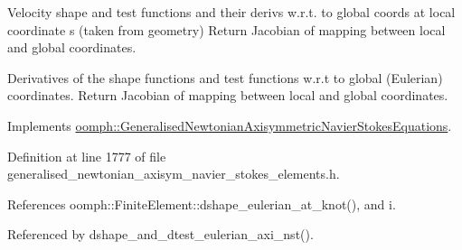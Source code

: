 Velocity shape and test functions and their derivs w.\+r.\+t. to global coords at local coordinate s (taken from geometry) Return Jacobian of mapping between local and global coordinates. 

Derivatives of the shape functions and test functions w.\+r.\+t to global (Eulerian) coordinates. Return Jacobian of mapping between local and global coordinates. 

Implements \hyperlink{classoomph_1_1GeneralisedNewtonianAxisymmetricNavierStokesEquations_aea547f513386ed96746cbf55f70d6f78}{oomph\+::\+Generalised\+Newtonian\+Axisymmetric\+Navier\+Stokes\+Equations}.



Definition at line 1777 of file generalised\+\_\+newtonian\+\_\+axisym\+\_\+navier\+\_\+stokes\+\_\+elements.\+h.



References oomph\+::\+Finite\+Element\+::dshape\+\_\+eulerian\+\_\+at\+\_\+knot(), and i.



Referenced by dshape\+\_\+and\+\_\+dtest\+\_\+eulerian\+\_\+axi\+\_\+nst().

\mbox{\label{classoomph_1_1GeneralisedNewtonianAxisymmetricQTaylorHoodElement_a2db89147bd02f6f037b9f602758dc539}} 

